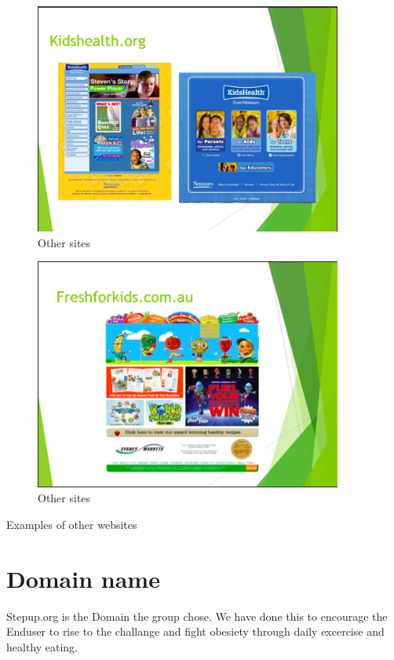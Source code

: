 \documentclass[letterpaper,twoside,12pt]{article}
\begin{document}
\begin{figure}[ht!]
  \centering
  \includegraphics[width=0.9\textwidth]{assets/jpg/othersite_2}
  \caption{Other sites}
  \label{fig:othersites}
\end{figure}
\FloatBarrier

\begin{figure}[ht!]
  \centering
  \includegraphics[width=0.9\textwidth]{assets/jpg/othersite_3}
  \caption{Other sites}
  \label{fig:othersites}
\end{figure}
\FloatBarrier

Examples of other websites

\section{Domain name}

Stepup.org is the Domain the group chose. We have done this to encourage the Enduser to rise to the challange and fight obesiety through daily excercise and healthy eating.
\end{document}

